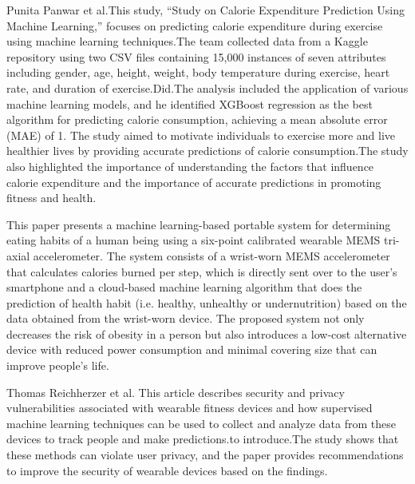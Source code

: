 \documentclass[conference]{IEEEtran}
\begin{document}
\newline
Punita Panwar et al.\textcolor{blue}{\citep{PunitaPanwar2}}This study, “Study on Calorie Expenditure Prediction Using Machine Learning,” focuses on predicting calorie expenditure during exercise using machine learning techniques.The team collected data from a Kaggle repository using two CSV files containing 15,000 instances of seven attributes including gender, age, height, weight, body temperature during exercise, heart rate, and duration of exercise.Did.The analysis included the application of various machine learning models, and he identified XGBoost regression  as the best algorithm for predicting calorie consumption, achieving a mean absolute error (MAE)  of 1. The study aimed to motivate individuals to exercise more and live healthier lives by providing accurate predictions of calorie consumption.The study also highlighted the importance of understanding the factors that influence calorie expenditure and the importance of accurate predictions in promoting fitness and health.
\newline

\newline
This paper presents a machine learning-based portable system for determining eating habits of a human being using a six-point calibrated wearable MEMS tri-axial accelerometer. The system consists of a wrist-worn MEMS accelerometer that calculates calories burned per step, which is directly sent over to the user’s smartphone and a cloud-based machine learning algorithm that does the prediction of health habit (i.e. healthy, unhealthy or undernutrition) based on the data obtained from the wrist-worn device. The proposed system not only decreases the risk of obesity in a person but also introduces a low-cost alternative device with reduced power consumption and minimal covering size that can improve people’s life.
\newline

\newline 
Thomas Reichherzer et al.\textcolor{blue}{\citep{Thomas4}}
This article describes security and privacy vulnerabilities associated with wearable fitness devices and how supervised machine learning techniques can be used to collect and analyze data from these devices  to track people and make predictions.to introduce.The study shows that these methods can violate user privacy, and the paper provides recommendations to improve the security of wearable devices based on the findings.
\newline
\end{document}
